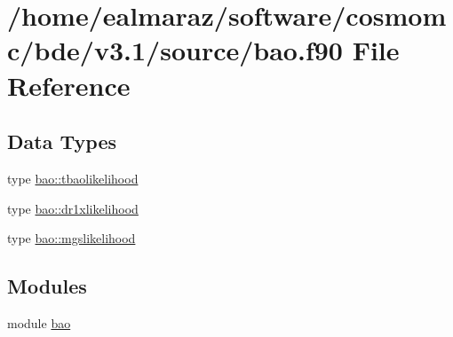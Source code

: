 \hypertarget{bao_8f90}{}\section{/home/ealmaraz/software/cosmomc/bde/v3.1/source/bao.f90 File Reference}
\label{bao_8f90}
\subsection*{Data Types}
\begin{DoxyCompactItemize}
\item 
type \mbox{\hyperlink{structbao_1_1tbaolikelihood}{bao\+::tbaolikelihood}}
\item 
type \mbox{\hyperlink{structbao_1_1dr1xlikelihood}{bao\+::dr1xlikelihood}}
\item 
type \mbox{\hyperlink{structbao_1_1mgslikelihood}{bao\+::mgslikelihood}}
\end{DoxyCompactItemize}
\subsection*{Modules}
\begin{DoxyCompactItemize}
\item 
module \mbox{\hyperlink{namespacebao}{bao}}
\end{DoxyCompactItemize}
